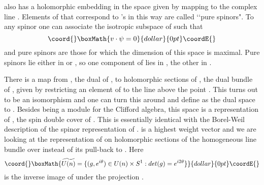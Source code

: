 \documentclass[a4paper,a4paper]{article}
\theoremstyle{conjecture}
\begin{document}
\coordHE{} also has a holomorphic embedding in the space
\coordHE{} given by mapping \coordHE{} to the complex line \coordHE{}. Elements of \coordHE{} that correspond to \coordHE{}'s in this way are
called \lq\lq pure spinors".  To any spinor \myHighlight{$\psi$}\coordHE{} one can
associate the isotropic subspace of \coordHE{} such that
$$\coord{}\boxMath{v\cdot\psi=0}{dollar}{0pt}\coordE{}$$
and pure spinors are those for which the dimension of this space
is maximal. Pure spinors lie either in \coordHE{} or \coordHE{}, so one
component of \coordHE{} lies in \coordHE{}, the other in
\coordHE{}.

There is a map from \coordHE{}, the dual of \coordHE{}, to holomorphic
sections of \coordHE{}, the dual bundle of \coordHE{}, given by restricting
an element of \coordHE{} to the line \coordHE{} above the point
\coordHE{}.  This turns out to be an isomorphism
\cite{PS} and one can turn this around and define \coordHE{} as the dual
space to \coordHE{}.  Besides being a module for the Clifford
algebra, this space is a representation of \coordHE{}, the spin
double cover of \coordHE{}.  This is essentially identical with the
Borel-Weil description of the spinor representation of \coordHE{}.
\coordHE{} is a highest weight vector and we are looking at the
representation of \coordHE{} on holomorphic sections of the homogeneous
line bundle \coordHE{} over \coordHE{}  instead of
its pull-back to \coordHE{}. Here
$$\coord{}\boxMath{\widetilde{U(n)}=\{(g,e^{i\theta})\in U(n)\times S^1:
det(g)=e^{i2\theta}\}}{dollar}{0pt}\coordE{}$$ is the inverse image of \coordHE{} under the projection \coordHE{}.
\end{document}
